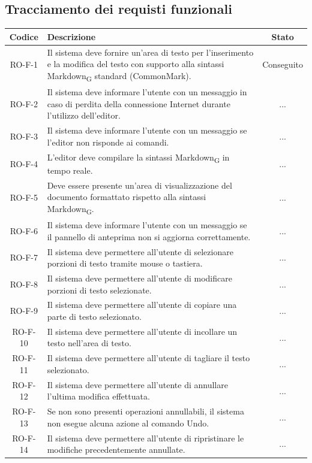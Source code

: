\documentclass[11pt,a4paper]{article}
\newcommand{\gls}[1]{#1\textsubscript{G}}
\begin{document}
\subsection{Tracciamento dei requisti funzionali}
\begin{longtable}{|c|p{11cm}|c|}
\hline
\textbf{Codice} & \textbf{Descrizione} & \textbf{Stato}\\
\hline
\endhead
RO-F-1 & Il sistema deve fornire un’area di testo per l’inserimento e la modifica del testo con supporto alla sintassi \gls{Markdown} standard (CommonMark).& Conseguito\\
\hline
RO-F-2 & Il sistema deve informare l’utente con un messaggio in caso di perdita della connessione Internet durante l’utilizzo dell’editor. & ...\\
\hline
RO-F-3 & Il sistema deve informare l’utente con un messaggio se l’editor non risponde ai comandi.& ...\\
\hline
RO-F-4 & L'editor deve compilare la sintassi \gls{Markdown} in tempo reale. & ... \\
\hline
RO-F-5 & Deve essere presente un'area di visualizzazione del documento formattato rispetto alla sintassi \gls{Markdown}. & ... \\
\hline
RO-F-6 & Il sistema deve informare l'utente con un messaggio se il pannello di anteprima non si aggiorna correttamente. & ... \\
\hline
RO-F-7 & Il sistema deve permettere all'utente di selezionare porzioni di testo tramite mouse o tastiera. & ... \\
\hline
RO-F-8 & Il sistema deve permettere all'utente di modificare porzioni di testo selezionate. & ... \\
\hline
RO-F-9 & Il sistema deve permettere all'utente di copiare una parte di testo selezionato. & ... \\
\hline
RO-F-10 & Il sistema deve permettere all'utente di incollare un testo nell'area di testo. & ... \\
\hline
RO-F-11 & Il sistema deve permettere all'utente di tagliare il testo selezionato. & ... \\
\hline
RO-F-12 & Il sistema deve permettere all'utente di annullare l'ultima modifica effettuata. & ... \\
\hline
RO-F-13 & Se non sono presenti operazioni annullabili, il sistema non esegue alcuna azione al comando Undo. & ... \\
\hline
RO-F-14 & Il sistema deve permettere all'utente di ripristinare le modifiche precedentemente annullate. & ... \\

\end{longtable}
\end{document}
